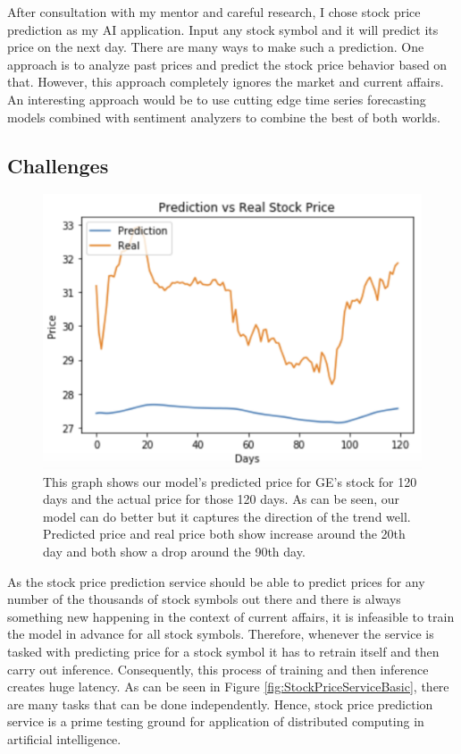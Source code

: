 \documentclass{report}
\begin{document}
After consultation with my mentor and careful research, I chose stock price prediction as my AI application. Input any stock symbol and it will predict its price on the next day. There are many ways to make such a prediction. One approach is to analyze past prices and predict the stock price behavior based on that. However, this approach completely ignores the market and current affairs. An interesting approach would be to use cutting edge time series forecasting models combined with sentiment analyzers to combine the best of both worlds.

\subsection{Challenges}

\begin{figure}
  \includegraphics[width=\textwidth]{PredictionRealPrice.png}
  \caption{This graph shows our model's predicted price for GE's stock for 120 days and the actual price for those 120 days. As can be seen, our model can do better but it captures the direction of the trend well. Predicted price and real price both show increase around the 20th day and both show a drop around the 90th day.}
  \label{fig:PredictionRealPrice}
\end{figure}

As the stock price prediction service should be able to predict prices for any number of the thousands of stock symbols out there and there is always something new happening in the context of current affairs, it is infeasible to train the model in advance for all stock symbols.
Therefore, whenever the service is tasked with predicting price for a stock symbol it has to retrain itself and then carry out inference.
Consequently, this process of training and then inference creates huge latency.
As can be seen in Figure \ref{fig:StockPriceServiceBasic}, there are many tasks that can be done independently.
Hence, stock price prediction service is a prime testing ground for application of distributed computing in artificial intelligence.
\end{document}

